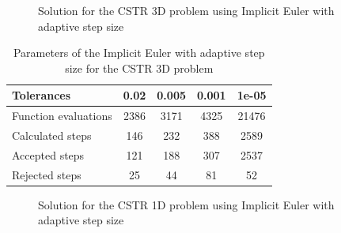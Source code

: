 \begin{figure}[H]
    \centering
    \caption{Solution for the CSTR 3D problem using Implicit Euler with adaptive step size}
    \label{3_5_3D_tols}
\end{figure}

\begin{table}[H]
    \centering
    \begin{tabular}{@{}l|cccc@{}}
    \toprule
    Tolerances           & 0.02 & 0.005 & 0.001 & 1e-05 \\ \midrule
    Function evaluations & 2386 & 3171  & 4325  & 21476 \\
    Calculated steps     & 146  & 232   & 388   & 2589  \\
    Accepted steps       & 121  & 188   & 307   & 2537  \\
    Rejected steps       & 25   & 44    & 81    & 52    \\ \bottomrule
    \end{tabular}
    \caption{Parameters of the Implicit Euler with adaptive step size for the CSTR 3D problem}
    \label{3_5_3D_tols_table}
\end{table}

\begin{figure}[H]
    \centering
    \caption{Solution for the CSTR 1D problem using Implicit Euler with adaptive step size}
    \label{3_5_1D_tols}
\end{figure}

